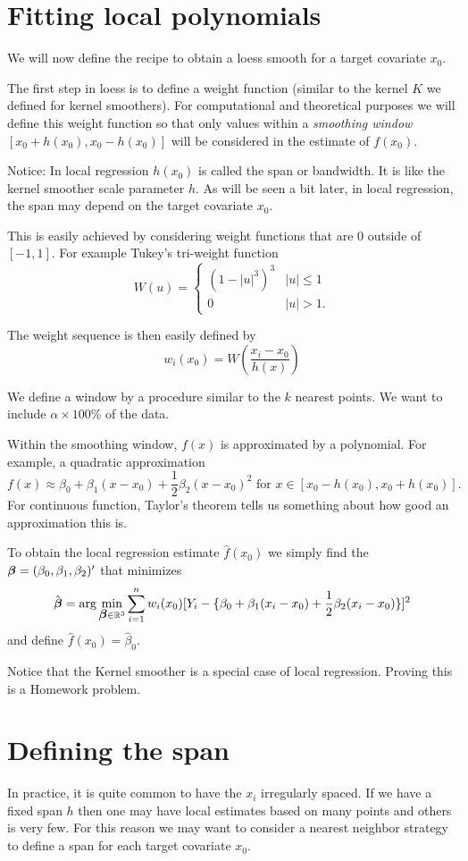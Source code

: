 \section{Fitting local polynomials}
We will now define the recipe to obtain a loess smooth for a target
covariate $x_0$. 

The first step in loess is to define a weight function (similar to the
kernel $K$ we defined for kernel smoothers). For computational
and theoretical purposes we will define this weight function so that
only values within a {\it smoothing window} $[x_0+h(x_0),x_0-h(x_0)]$ will be
considered in the estimate of $f(x_0)$.  

Notice: In local regression $h(x_0)$ is called the span or bandwidth. It
is like the kernel smoother scale parameter $h$. As will be seen a bit
later, in local regression, the span may depend on the target
covariate $x_0$.

This is easily achieved by
considering  weight functions that are $0$ outside of $[-1,1]$. For example
Tukey's tri-weight function
\[
W(u) = \left\{ \begin{array}{cc}
(1 - |u|^3)^3&|u| \leq 1\\
0&|u| > 1.
\end{array}
\right.
\]

The weight sequence is then easily defined by
\[
w_i(x_0) = W \left( \frac{x_i - x_0}{h(x)} \right)
\]

We define a window by a procedure similar to the $k$ nearest
points. We want to include $\alpha\times 100$\% of the data. 

Within the smoothing window, $f(x)$ is approximated by a
polynomial. For example, a quadratic approximation
\[
f(x) \approx \beta_0 + \beta_1 (x-x_0) + \frac{1}{2} \beta_2 (x-x_0)^2 \mbox{ for
  } x \in [x_0 - h(x_0), x_0+h(x_0)].
\]
For continuous function, Taylor's theorem tells us something about how
good an approximation this is.

To obtain the local regression estimate $\hat{f}(x_0)$ we simply find
the $\mbox{\boldmath $\beta$\unboldmath} = (\beta_0,\beta_1,\beta_2)'$ that minimizes
\[
\hat{\mbox{\boldmath $\beta$\unboldmath}} = \arg \min_{\mbox{\boldmath $\beta$\unboldmath} \in {\mathbb R}^3} \sum_{i=1}^n w_i(x_0)[ Y_i - \{\beta_0 + \beta_1 (x_i-x_0) + \frac{1}{2} \beta_2 (x_i-x_0)\}]^2
\]
and define $\hat{f}(x_0) = \hat{\beta}_0$.

Notice that the Kernel smoother is a special case of local
regression. Proving this is a Homework problem.

\section{Defining the span}
In practice, it is quite common to have the $x_i$ irregularly
spaced. If we have a fixed span $h$ then one may have local estimates
based on many points and others is very few. For this reason we may
want to consider a nearest neighbor strategy to define a span for
each target covariate $x_0$.

